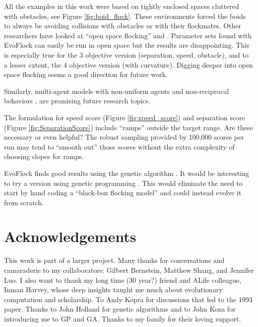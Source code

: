 \documentclass[letterpaper]{article}
\begin{document}
All the examples in this work were based on tightly enclosed spaces cluttered with obstacles, see Figure \ref{fig:boid_flock}. These environments forced the boids to always be avoiding collisions with obstacles or with their flockmates. Other researchers have looked at ``open space flocking'' \citep{hoetzlein_flock2_2024} and \citep{brambati_learning_2025}. Parameter sets found with EvoFlock can easily be run in open space but the results are disappointing. This is especially true for the 3 objective version (separation, speed, obstacle), and to a lesser extent, the 4 objective version (with curvature). Digging deeper into open space flocking seems a good direction for future work.

Similarly, multi-agent models with non-uniform agents \citep{montanari_optimal_2025} and non-reciprocal behaviors \citep{choi_flocking_2025}, \citep{weis_generalized_2025} are promising future research topics.

The formulation for speed score (Figure \ref{fig:speed_score}) and separation score (Figure \ref{fig:SeparationScore}) include ``ramps'' outside the target range. Are these necessary or even helpful? The robust sampling provided by 100,000 scores per run may tend to ``smooth out'' those scores without the extra complexity of choosing slopes for ramps.

EvoFlock finds good results using the genetic algorithm \citep{holland_adaptation_1975}. It would be interesting to try a version using genetic programming \citep{koza_genetic_1992}. This would eliminate the need to start by hand coding a ``black-box flocking model'' and could instead evolve it from scratch.

\section{Acknowledgements}
\label{sec:ack}

This work is part of a larger project. Many thanks for conversations and camaraderie to my collaborators: Gilbert Bernstein, Matthew Shang, and Jennifer Luo. I also want to thank my long time (30 year?) friend and ALife colleague, Inman Harvey, whose deep insights taught me much about evolutionary computation and scholarship. To Andy Kopra for discussions that led to the 1993 paper. Thanks to John Holland for genetic algorithms and to John Koza for introducing me to GP and GA. Thanks to my family for their loving support.






\end{document}
